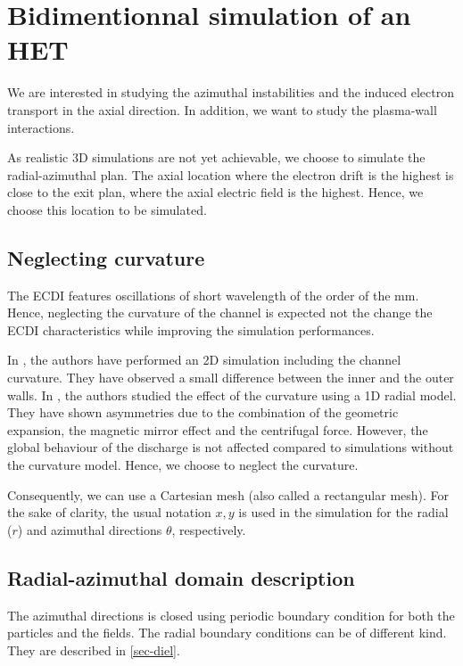 
\section{Bidimentionnal simulation of an \ac{HET}}

We are interested in studying the azimuthal instabilities and the induced electron transport in the axial direction.
In addition, we want to study the plasma-wall interactions.

As realistic \ac{3D} simulations are not yet achievable, we choose to simulate the radial-azimuthal plan.
The axial location where the electron drift is the highest is close to the exit plan, where the axial electric field is the highest.
Hence, we choose this location to be simulated.


\subsection{Neglecting curvature}
The \ac{ECDI} features oscillations of short wavelength of the order of the mm.
Hence, neglecting the curvature of the channel is expected not the change the \ac{ECDI} characteristics while improving the simulation performances.

In  \citet{heron2013},  the authors have performed an \ac{2D} simulation including the channel curvature.
They have observed a small difference between the inner and the outer walls.
In  \citet{dominguez-vazquez2018}, the authors studied the effect of the curvature using a \ac{1D} radial model.
They have shown asymmetries due to the combination of the geometric expansion, the magnetic mirror effect and the centrifugal force.
However, the global behaviour of the discharge is not affected compared to simulations without the curvature model.
Hence, we choose to neglect the curvature.

Consequently, we can use a Cartesian mesh (also called a rectangular mesh).
For the sake of clarity, the usual notation $x,y$ is used in the simulation for the radial ($r$) and azimuthal directions $\theta$, respectively.

\subsection{Radial-azimuthal domain description}


The azimuthal directions is closed using periodic boundary condition for both the particles and the fields.
The radial boundary conditions can be of different kind.
They are described in \cref{sec-diel}.

